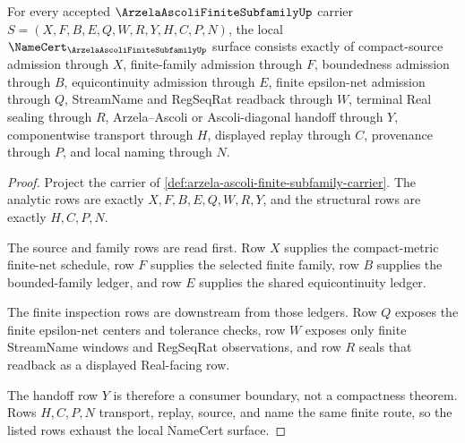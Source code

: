 \begin{theorem}
\label{thm:arzela-ascoli-finite-subfamily-namecert-obligations}
For every accepted $\ArzelaAscoliFiniteSubfamilyUp$ carrier $S=(X,F,B,E,Q,W,R,Y,H,C,P,N)$, the local $\NameCert_{\ArzelaAscoliFiniteSubfamilyUp}$ surface consists exactly of compact-source admission through $X$, finite-family admission through $F$, boundedness admission through $B$, equicontinuity admission through $E$, finite epsilon-net admission through $Q$, StreamName and RegSeqRat readback through $W$, terminal Real sealing through $R$, Arzela--Ascoli or Ascoli-diagonal handoff through $Y$, componentwise transport through $H$, displayed replay through $C$, provenance through $P$, and local naming through $N$.
\end{theorem}
\begin{proof}
Project the carrier of \autoref{def:arzela-ascoli-finite-subfamily-carrier}. The analytic rows are exactly $X,F,B,E,Q,W,R,Y$, and the structural rows are exactly $H,C,P,N$.

The source and family rows are read first. Row $X$ supplies the compact-metric finite-net schedule, row $F$ supplies the selected finite family, row $B$ supplies the bounded-family ledger, and row $E$ supplies the shared equicontinuity ledger.

The finite inspection rows are downstream from those ledgers. Row $Q$ exposes the finite epsilon-net centers and tolerance checks, row $W$ exposes only finite StreamName windows and RegSeqRat observations, and row $R$ seals that readback as a displayed Real-facing row.

The handoff row $Y$ is therefore a consumer boundary, not a compactness theorem. Rows $H,C,P,N$ transport, replay, source, and name the same finite route, so the listed rows exhaust the local NameCert surface.
\end{proof}

